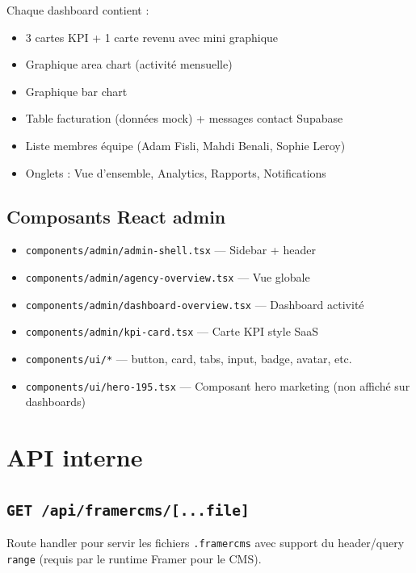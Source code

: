 \documentclass[11pt,a4paper]{report}
\begin{document}
Chaque dashboard contient :
\begin{itemize}[leftmargin=*]
  \item 3 cartes KPI + 1 carte revenu avec mini graphique
  \item Graphique area chart (activité mensuelle)
  \item Graphique bar chart
  \item Table facturation (données mock) + messages contact Supabase
  \item Liste membres équipe (Adam Fisli, Mahdi Benali, Sophie Leroy)
  \item Onglets : Vue d'ensemble, Analytics, Rapports, Notifications
\end{itemize}

\section{Composants React admin}

\begin{itemize}[leftmargin=*]
  \item \texttt{components/admin/admin-shell.tsx} — Sidebar + header
  \item \texttt{components/admin/agency-overview.tsx} — Vue globale
  \item \texttt{components/admin/dashboard-overview.tsx} — Dashboard activité
  \item \texttt{components/admin/kpi-card.tsx} — Carte KPI style SaaS
  \item \texttt{components/ui/*} — button, card, tabs, input, badge, avatar, etc.
  \item \texttt{components/ui/hero-195.tsx} — Composant hero marketing (non affiché sur dashboards)
\end{itemize}

\chapter{API interne}

\section{\texttt{GET /api/framercms/[...file]}}

Route handler pour servir les fichiers \texttt{.framercms} avec support du header/query \texttt{range} (requis par le runtime Framer pour le CMS).
\end{document}
